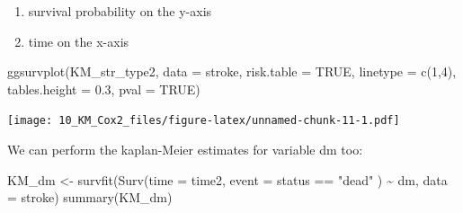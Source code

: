 \documentclass[
  10pt,
]{krantz}
\newenvironment{Shaded}{\begin{snugshade}}{\end{snugshade}}
\newcommand{\AttributeTok}[1]{\textcolor[rgb]{0.77,0.63,0.00}{#1}}
\newcommand{\ConstantTok}[1]{\textcolor[rgb]{0.00,0.00,0.00}{#1}}
\newcommand{\DecValTok}[1]{\textcolor[rgb]{0.00,0.00,0.81}{#1}}
\newcommand{\FloatTok}[1]{\textcolor[rgb]{0.00,0.00,0.81}{#1}}
\newcommand{\FunctionTok}[1]{\textcolor[rgb]{0.00,0.00,0.00}{#1}}
\newcommand{\NormalTok}[1]{#1}
\newcommand{\OtherTok}[1]{\textcolor[rgb]{0.56,0.35,0.01}{#1}}
\newcommand{\SpecialCharTok}[1]{\textcolor[rgb]{0.00,0.00,0.00}{#1}}
\newcommand{\StringTok}[1]{\textcolor[rgb]{0.31,0.60,0.02}{#1}}
\providecommand{\tightlist}{%
  \setlength{\itemsep}{0pt}\setlength{\parskip}{0pt}}
\begin{document}
\begin{enumerate}
\def\labelenumi{\arabic{enumi}.}
\tightlist
\item
  survival probability on the y-axis
\item
  time on the x-axis
\end{enumerate}

\begin{Shaded}
\begin{Highlighting}[]
\FunctionTok{ggsurvplot}\NormalTok{(KM\_str\_type2, }
           \AttributeTok{data =}\NormalTok{ stroke, }
           \AttributeTok{risk.table =} \ConstantTok{TRUE}\NormalTok{, }
           \AttributeTok{linetype =} \FunctionTok{c}\NormalTok{(}\DecValTok{1}\NormalTok{,}\DecValTok{4}\NormalTok{),}
           \AttributeTok{tables.height =} \FloatTok{0.3}\NormalTok{,}
           \AttributeTok{pval =} \ConstantTok{TRUE}\NormalTok{)}
\end{Highlighting}
\end{Shaded}

\texttt{[image: 10\_KM\_Cox2\_files/figure-latex/unnamed-chunk-11-1.pdf]}

We can perform the kaplan-Meier estimates for variable dm too:

\begin{Shaded}
\begin{Highlighting}[]
\NormalTok{KM\_dm }\OtherTok{\textless{}{-}} \FunctionTok{survfit}\NormalTok{(}\FunctionTok{Surv}\NormalTok{(}\AttributeTok{time =}\NormalTok{ time2, }
                      \AttributeTok{event =}\NormalTok{ status }\SpecialCharTok{==} \StringTok{"dead"}\NormalTok{ ) }\SpecialCharTok{\textasciitilde{}}\NormalTok{ dm,}
                 \AttributeTok{data =}\NormalTok{ stroke)}
\FunctionTok{summary}\NormalTok{(KM\_dm)}
\end{Highlighting}
\end{Shaded}
\end{document}

